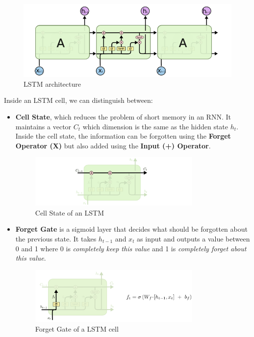 \begin{figure}[H]
    \centering
    \includegraphics[width=\textwidth]{LSTM immagini/LSTM.png}
    \caption{LSTM architecture}
\end{figure}
Inside an LSTM cell, we can distinguish between:
\begin{itemize}
    \item \textbf{Cell State}, which reduces the problem of short memory in an RNN. It maintains a vector $C_t$ which dimension is the same as the hidden state $h_t$. Inside the cell state, the information can be forgotten using the \textbf{Forget Operator (X)} but also added using the \textbf{Input (+) Operator}.
    
    \begin{figure}[H]
        \centering
        \includegraphics[width=0.8\textwidth]{LSTM immagini/cell state.png}
        \caption{Cell State of an LSTM}
    \end{figure}
    
    \item \textbf{Forget Gate} is a sigmoid layer that decides what should be forgotten about the previous state. It takes $h_{t-1}$ and $x_t$ as input and outputs a value between 0 and 1 where 0 is \textit{completely keep this value} and 1 is \textit{completely forget about this value}.
    \begin{figure}[H]
        \centering
        \includegraphics[width=0.8\textwidth]{LSTM immagini/forget gate.png}
        \caption{Forget Gate of a LSTM cell}
    \end{figure}
    

\end{itemize}
